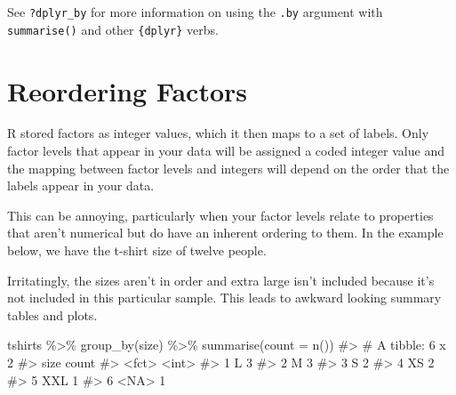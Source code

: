 \documentclass[
  letterpaper,
  DIV=11,
  numbers=noendperiod]{scrreprt}
\newenvironment{Shaded}{\begin{snugshade}}{\end{snugshade}}
\newcommand{\AttributeTok}[1]{\textcolor[rgb]{0.40,0.45,0.13}{#1}}
\newcommand{\CommentTok}[1]{\textcolor[rgb]{0.37,0.37,0.37}{#1}}
\newcommand{\ConstantTok}[1]{\textcolor[rgb]{0.56,0.35,0.01}{#1}}
\newcommand{\DecValTok}[1]{\textcolor[rgb]{0.68,0.00,0.00}{#1}}
\newcommand{\FunctionTok}[1]{\textcolor[rgb]{0.28,0.35,0.67}{#1}}
\newcommand{\NormalTok}[1]{\textcolor[rgb]{0.00,0.23,0.31}{#1}}
\newcommand{\OtherTok}[1]{\textcolor[rgb]{0.00,0.23,0.31}{#1}}
\newcommand{\SpecialCharTok}[1]{\textcolor[rgb]{0.37,0.37,0.37}{#1}}
\newcommand{\StringTok}[1]{\textcolor[rgb]{0.13,0.47,0.30}{#1}}
\begin{document}
See \texttt{?dplyr\_by} for more information on using the \texttt{.by}
argument with \texttt{summarise()} and other \texttt{\{dplyr\}} verbs.

\section{Reordering Factors}\label{reordering-factors}

R stored factors as integer values, which it then maps to a set of
labels. Only factor levels that appear in your data will be assigned a
coded integer value and the mapping between factor levels and integers
will depend on the order that the labels appear in your data.

This can be annoying, particularly when your factor levels relate to
properties that aren't numerical but do have an inherent ordering to
them. In the example below, we have the t-shirt size of twelve people.

\begin{Shaded}
\end{Shaded}

Irritatingly, the sizes aren't in order and extra large isn't included
because it's not included in this particular sample. This leads to
awkward looking summary tables and plots.

\begin{Shaded}
\begin{Highlighting}[]
\NormalTok{tshirts }\SpecialCharTok{\%\textgreater{}\%} \FunctionTok{group\_by}\NormalTok{(size) }\SpecialCharTok{\%\textgreater{}\%} \FunctionTok{summarise}\NormalTok{(}\AttributeTok{count =} \FunctionTok{n}\NormalTok{())}
\CommentTok{\#\textgreater{} \# A tibble: 6 x 2}
\CommentTok{\#\textgreater{}   size  count}
\CommentTok{\#\textgreater{}   \textless{}fct\textgreater{} \textless{}int\textgreater{}}
\CommentTok{\#\textgreater{} 1 L         3}
\CommentTok{\#\textgreater{} 2 M         3}
\CommentTok{\#\textgreater{} 3 S         2}
\CommentTok{\#\textgreater{} 4 XS        2}
\CommentTok{\#\textgreater{} 5 XXL       1}
\CommentTok{\#\textgreater{} 6 \textless{}NA\textgreater{}      1}
\end{Highlighting}
\end{Shaded}
\end{document}
